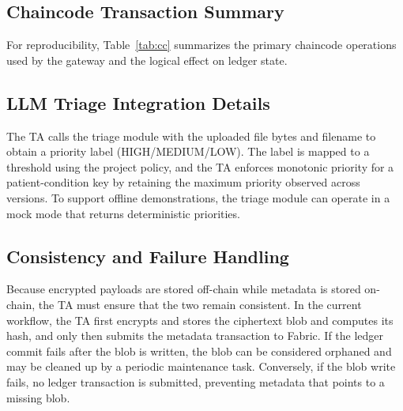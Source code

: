 \documentclass{IEEEtran}
\begin{document}
\subsection{Chaincode Transaction Summary}
For reproducibility, Table~\ref{tab:cc} summarizes the primary chaincode operations used by the gateway and the logical effect on ledger state.
\begin{table}[!t]
\caption{Chaincode Transactions and Ledger Effects}
\label{tab:cc}
\centering
\footnotesize
\setlength{\tabcolsep}{3pt}
\end{table}

\subsection{LLM Triage Integration Details}
The TA calls the triage module with the uploaded file bytes and filename to obtain a priority label (HIGH/MEDIUM/LOW). The label is mapped to a threshold using the project policy, and the TA enforces monotonic priority for a patient-condition key by retaining the maximum priority observed across versions. To support offline demonstrations, the triage module can operate in a mock mode that returns deterministic priorities.

\subsection{Consistency and Failure Handling}
Because encrypted payloads are stored off-chain while metadata is stored on-chain, the TA must ensure that the two remain consistent. In the current workflow, the TA first encrypts and stores the ciphertext blob and computes its hash, and only then submits the metadata transaction to Fabric. If the ledger commit fails after the blob is written, the blob can be considered orphaned and may be cleaned up by a periodic maintenance task. Conversely, if the blob write fails, no ledger transaction is submitted, preventing metadata that points to a missing blob.
\end{document}
